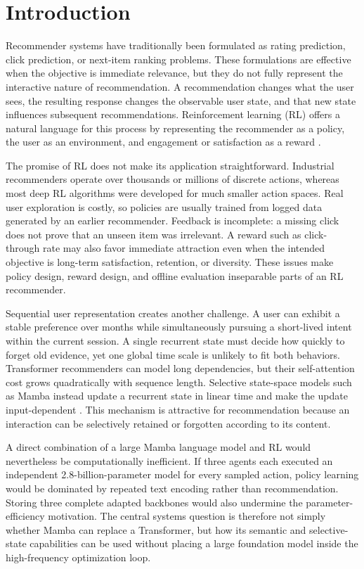 \documentclass[11pt,a4paper]{article}
\begin{document}
\section{Introduction}

Recommender systems have traditionally been formulated as rating prediction, click prediction, or next-item ranking problems. These formulations are effective when the objective is immediate relevance, but they do not fully represent the interactive nature of recommendation. A recommendation changes what the user sees, the resulting response changes the observable user state, and that new state influences subsequent recommendations. Reinforcement learning (RL) offers a natural language for this process by representing the recommender as a policy, the user as an environment, and engagement or satisfaction as a reward \cite{RLSURVEY}.

The promise of RL does not make its application straightforward. Industrial recommenders operate over thousands or millions of discrete actions, whereas most deep RL algorithms were developed for much smaller action spaces. Real user exploration is costly, so policies are usually trained from logged data generated by an earlier recommender. Feedback is incomplete: a missing click does not prove that an unseen item was irrelevant. A reward such as click-through rate may also favor immediate attraction even when the intended objective is long-term satisfaction, retention, or diversity. These issues make policy design, reward design, and offline evaluation inseparable parts of an RL recommender.

Sequential user representation creates another challenge. A user can exhibit a stable preference over months while simultaneously pursuing a short-lived intent within the current session. A single recurrent state must decide how quickly to forget old evidence, yet one global time scale is unlikely to fit both behaviors. Transformer recommenders can model long dependencies, but their self-attention cost grows quadratically with sequence length. Selective state-space models such as Mamba instead update a recurrent state in linear time and make the update input-dependent \cite{MAMBA}. This mechanism is attractive for recommendation because an interaction can be selectively retained or forgotten according to its content.

A direct combination of a large Mamba language model and RL would nevertheless be computationally inefficient. If three agents each executed an independent 2.8-billion-parameter model for every sampled action, policy learning would be dominated by repeated text encoding rather than recommendation. Storing three complete adapted backbones would also undermine the parameter-efficiency motivation. The central systems question is therefore not simply whether Mamba can replace a Transformer, but how its semantic and selective-state capabilities can be used without placing a large foundation model inside the high-frequency optimization loop.
\end{document}
